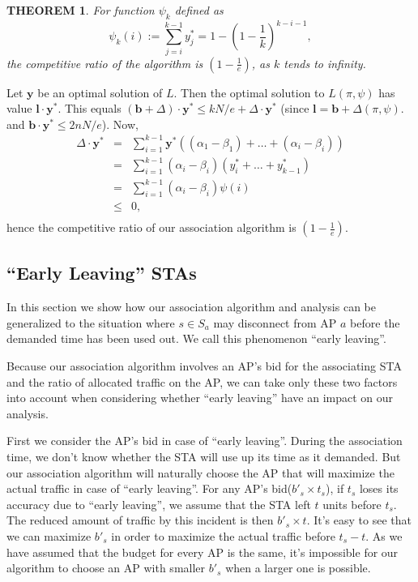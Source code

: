 \documentclass[conference]{IEEEtran}
\newtheorem{theorem}{THEOREM}
\begin{document}
  \begin{theorem}
    For function $\psi_k$ defined as
    \begin{equation*}
      \psi_k(i):=\sum_{j=i}^{k-1}y_{j}^{*}=1-(1-\frac{1}{k})^{k-i-1},
    \end{equation*}
    the competitive ratio of the algorithm is $(1-\frac{1}{e})$, as $k$ tends to infinity.
  \end{theorem}
  \begin{IEEEproof}
    Let $\bm{y}$ be an optimal solution of $L$. Then the optimal solution to $L(\pi,\psi)$ has value $\bm{l}\cdot\bm{y}^*$.  This equals $(\bm{b}+\Delta)\cdot \bm{y}^*\leq kN/e+\Delta\cdot \bm{y}^*$ (since $ \bm{l}=\bm{b}+\Delta(\pi,\psi).$ and $\bm{b}\cdot \bm{y}^*\leq 2nN/e$).  Now,
    \begin{eqnarray*}
      \Delta\cdot \bm{y}^{*}&=&\sum_{i=1}^{k-1}\bm{y}^{*}((\alpha_1-\beta_1)+\ldots+(\alpha_i-\beta_i))\\
      &=&\sum_{i=1}^{k-1}(\alpha_i-\beta_i)(y_i^{*}+\ldots+y_{k-1}^{*})\\
      &=&\sum_{i=1}^{k-1}(\alpha_i-\beta_i)\psi(i)\\
      &\leq& 0,\\
    \end{eqnarray*}
     hence the competitive ratio of our association algorithm is $(1-\frac{1}{e})$.
  \end{IEEEproof}

  \subsection{``Early Leaving'' STAs}

  In this section we show how our association algorithm and analysis can be generalized to the situation where $s\in S_a$ may disconnect from AP $a$ before the demanded time has been used out. We call this phenomenon ``early leaving''.

  Because our association algorithm involves an AP's bid for the associating STA and the ratio of allocated traffic on the AP, we can take only these two factors into account when considering whether ``early leaving'' have an impact on our analysis.

  First we consider the AP's bid in case of ``early leaving''. During the association time, we don't know whether the STA will use up its time as it demanded. But our association algorithm will naturally choose the AP that will maximize the actual traffic in case of ``early leaving''. For any AP's bid($b'_s \times t_s$), if  $t_s$ loses its accuracy due to ``early leaving'', we assume that the STA left $t$ units before $t_s$. The reduced amount of traffic by this incident is then $b'_s \times t$. It's easy to see that we can maximize $b'_s$ in order to maximize the actual traffic before $t_s-t$. As we have assumed that the budget for every AP is the same, it's impossible for our algorithm to choose an AP with smaller $b'_s$ when a larger one is possible.
\end{document}
